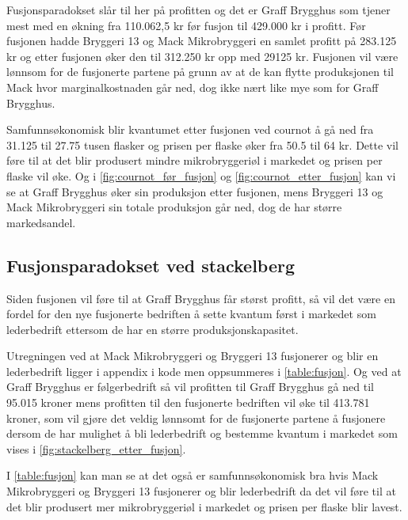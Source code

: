 \documentclass[
  12pt,
  a4paper,
  DIV=11,
  numbers=noendperiod]{scrartcl}
\begin{document}
Fusjonsparadokset slår til her på profitten og det er Graff Brygghus som
tjener mest med en økning fra 110.062,5 kr før fusjon til 429.000 kr i
profitt. Før fusjonen hadde Bryggeri 13 og Mack Mikrobryggeri en samlet
profitt på 283.125 kr og etter fusjonen øker den til 312.250 kr opp med
29125 kr. Fusjonen vil være lønnsom for de fusjonerte partene på grunn
av at de kan flytte produksjonen til Mack hvor marginalkostnaden går
ned, dog ikke nært like mye som for Graff Brygghus.

Samfunnsøkonomisk blir kvantumet etter fusjonen ved cournot å gå ned fra
31.125 til 27.75 tusen flasker og prisen per flaske øker fra 50.5 til 64
kr. Dette vil føre til at det blir produsert mindre mikrobryggeriøl i
markedet og prisen per flaske vil øke. Og i
\autoref{fig:cournot_før_fusjon} og \autoref{fig:cournot_etter_fusjon}
kan vi se at Graff Brygghus øker sin produksjon etter fusjonen, mens
Bryggeri 13 og Mack Mikrobryggeri sin totale produksjon går ned, dog de
har større markedsandel.

\subsection{Fusjonsparadokset ved
stackelberg}\label{fusjonsparadokset-ved-stackelberg}

Siden fusjonen vil føre til at Graff Brygghus får størst profitt, så vil
det være en fordel for den nye fusjonerte bedriften å sette kvantum
først i markedet som lederbedrift ettersom de har en større
produksjonskapasitet.

Utregningen ved at Mack Mikrobryggeri og Bryggeri 13 fusjonerer og blir
en lederbedrift ligger i appendix i kode men oppsummeres i
\autoref{table:fusjon}. Og ved at Graff Brygghus er følgerbedrift så vil
profitten til Graff Brygghus gå ned til 95.015 kroner mens profitten til
den fusjonerte bedriften vil øke til 413.781 kroner, som vil gjøre det
veldig lønnsomt for de fusjonerte partene å fusjonere dersom de har
mulighet å bli lederbedrift og bestemme kvantum i markedet som vises i
\autoref{fig:stackelberg_etter_fusjon}.

\clearpage

I \autoref{table:fusjon} kan man se at det også er samfunnsøkonomisk bra
hvis Mack Mikrobryggeri og Bryggeri 13 fusjonerer og blir lederbedrift
da det vil føre til at det blir produsert mer mikrobryggeriøl i markedet
og prisen per flaske blir lavest.
\end{document}
